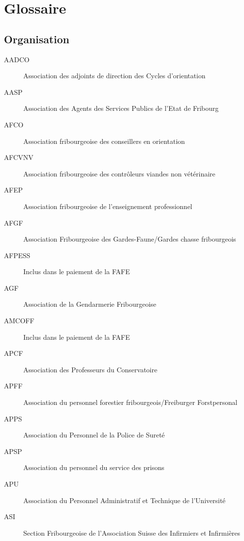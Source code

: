 \chapter{Glossaire}
\section{Organisation}%
\begin{description}
\item[AADCO]
	Association des adjoints de direction des Cycles d'orientation

\item[AASP]
	Association des Agents des Services Publics de l'Etat de Fribourg

\item[AFCO]
	Association fribourgeoise des conseillers en orientation

\item[AFCVNV]
	Association fribourgeoise des contrôleurs viandes non
	vétérinaire

\item[AFEP]
	Association fribourgeoise de l'enseignement professionnel

\item[AFGF]
	Association Fribourgeoise des Gardes-Faune/Gardes chasse
	fribourgeois

\item[AFPESS]
	Inclus dans le paiement de la FAFE

\item[AGF]
	Association de la Gendarmerie Fribourgeoise

\item[AMCOFF]
	Inclus dans le paiement de la FAFE

\item[APCF]
	Association des Professeurs du Conservatoire

\item[APFF]
	Association du personnel forestier fribourgeois/Freiburger
	Forstpersonal

\item[APPS]
	Association du Personnel de la Police de Sureté

\item[APSP]
	Association du personnel du service des prisons

\item[APU]
	Association du Personnel Administratif et Technique de
	l'Université

\item[ASI]
	Section Fribourgeoise de l'Association Suisse des Infirmiers
	et Infirmières


\end{description}
